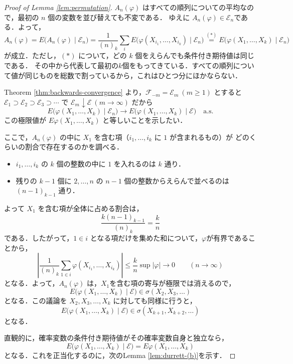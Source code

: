\documentclass[a4paper,11pt,uplatex,dvipdfmx]{jsarticle}
\theoremstyle{plain}
\theoremstyle{definition}
\begin{document}
\begin{proof}[Proof of Lemma \ref{lem:permutation}]
$A_n(\varphi)$ はすべての順列についての平均なので，最初の $n$ 個の変数を並び替えても不変である．
ゆえに $A_n(\varphi)\in\mathcal{E}_n$である．よって，
\[
  A_n(\varphi)=E\bigl(A_n(\varphi)\mid\mathcal{E}_n\bigr)
  =\frac{1}{(n)_k}\sum_{i}E\bigl(\varphi(X_{i_1},\dots,X_{i_k})\mid\mathcal{E}_n\bigr)
  \overset{(\ast)}{=}E\bigl(\varphi(X_1,\dots,X_k)\mid\mathcal{E}_n\bigr)
\]
が成立．ただし，$(\ast)$ について，どの $k$ 個をえらんでも条件付き期待値は同じである．
その中から代表して最初の$k$個をもってきている．すべての順列について値が同じものを総数で割っているから，これはひとつ分にほかならない．

Theorem \ref{thm:backwards-convergence} より，$\mathcal{F}_{-m}=\mathcal{E}_m\ (m\ge1)$ とすると
$\mathcal{E}_1\supset\mathcal{E}_2\supset\mathcal{E}_3\supset\cdots$ で $\mathcal{E}_m\downarrow\mathcal{E}\ (m\to\infty)$ だから
\[
  E\bigl(\varphi(X_1,\dots,X_k)\mid\mathcal{E}_n\bigr)\longrightarrow
  E\bigl(\varphi(X_1,\dots,X_k)\mid\mathcal{E}\bigr)\quad\text{a.s.}
\]
この極限値が $E\varphi(X_1,\dots,X_k)$ と等しいことを示したい．

ここで，$A_n(\varphi)$ の中に $X_1$ を含む項（$i_1,\dots,i_k$ に $1$ が含まれるもの）が
どのくらいの割合で存在するのかを調べる．
\begin{itemize}
  \item $i_1,\dots,i_k$ の $k$ 個の整数の中に $1$ を入れるのは $k$ 通り．
  \item 残りの $k-1$ 個に $2,\dots,n$ の $n-1$ 個の整数からえらんで並べるのは $(n-1)_{k-1}$ 通り．
\end{itemize}
よって $X_1$ を含む項が全体に占める割合は，
\[
  \frac{k(n-1)_{k-1}}{(n)_k}=\frac{k}{n}
\]
である．したがって，$1\in i$ となる項だけを集めた和について，$\varphi$が有界であることから，
\[
  \left|\frac{1}{(n)_k}\sum_{1\in i}\varphi(X_{i_1},\dots,X_{i_k})\right|
  \le\frac{k}{n}\sup|\varphi|\longrightarrow0\qquad(n\to\infty)
\]
となる．よって，$A_n(\varphi)$ は，$X_1$を含む項の寄与が極限では消えるので，
\[
  E\bigl(\varphi(X_1,\dots,X_k)\mid\mathcal{E}\bigr)\in\sigma(X_2,X_3,\dots)
\]
となる．この議論を $X_2,X_3,\dots,X_k$ に対しても同様に行うと，
\[
  E\bigl(\varphi(X_1,\dots,X_k)\mid\mathcal{E}\bigr)\in\sigma(X_{k+1},X_{k+2},\dots)
\]
となる．

直観的に，確率変数の条件付き期待値がその確率変数自身と独立なら，
\begin{equation}\label{eq:durrett-(a)}
  E\bigl(\varphi(X_1,\dots,X_k)\mid\mathcal{E}\bigr)=E\varphi(X_1,\dots,X_k)
\end{equation}
となる．これを正当化するのに，次のLemma \ref{lem:durrett-(b)}を示す．


\end{proof}
\end{document}
